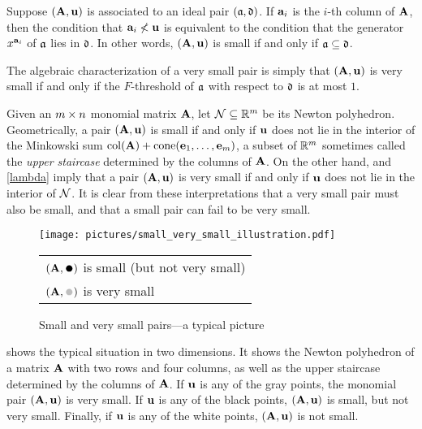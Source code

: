 \documentclass{article}
\begin{document}
\begin{remark}
\label{algebraic small and very small: R}
  Suppose $(\mathbf{A}, \mathbf{u})$ is associated to an ideal pair $(\mathfrak{a}, \mathfrak{d})$.  If $\mathbf{a}_i$ is the $i$-th column of $\mathbf{A}$, then the condition that $\mathbf{a}_i \not < \mathbf{u}$ is equivalent to the condition that the generator $x^{\mathbf{a}_i}$ of $\mathfrak{a}$ lies in $\mathfrak{d}$.  In other words, $(\mathbf{A}, \mathbf{u})$ is small if and only if $\mathfrak{a} \subseteq \mathfrak{d}$.

The algebraic characterization of a very small pair is simply that $(\mathbf{A}, \mathbf{u})$ is very small if and only if the $F$-threshold of $\mathfrak{a}$ with respect to $\mathfrak{d}$ is at most $1$.
\end{remark}

\begin{remark}
\label{geometric small and very small: R}
Given an $m \times n$ monomial matrix $\mathbf{A}$, let $\mathcal{N} \subseteq \mathbb{R}^{m}$ be its Newton polyhedron.
Geometrically, a pair $(\mathbf{A}, \mathbf{u})$ is small if and only if $\mathbf{u}$ does not lie in the interior of the Minkowski sum $\operatorname{col}(\mathbf{A}) + \operatorname{cone}(\mathbf{e}_1,\ldots,\mathbf{e}_m)$, a subset of $\mathbb{R}^{m}$ sometimes called the \emph{upper staircase} determined by the columns of $\mathbf{A}$.
On the other hand,  and \ref{lambda} imply that a pair $(\mathbf{A}, \mathbf{u})$ is very small if and only if $\mathbf{u}$ does not lie in the interior of $\mathcal{N}$.
It is clear from these interpretations that a very small pair must also be small, and that a small pair can fail to be very small.
\end{remark}

\begin{example}
   \label{ex: small vs very small}
   \begin{figure}
      \centering
      \texttt{[image: pictures/small\_very\_small\_illustration.pdf]}\\[2mm]
      \begin{tabular}{l}
        $(\matA,\mathbin{\vcenter{\hbox{\scalebox{1.5}{$\bullet$}}}})$ is small (but not very small)\\[1mm]
        $(\matA,\textcolor{lightgray}{\mathbin{\vcenter{\hbox{\scalebox{1.5}{$\bullet$}}}}})$ is very small
      \end{tabular}                                                              
      \caption{Small and very small pairs---a typical picture}
      \label{fig: small vs very small}
   \end{figure}
    shows the typical situation in two dimensions.
   It shows the Newton polyhedron of a matrix $\mathbf{A}$ with two rows and four columns, as well as the upper staircase determined by the columns of $\mathbf{A}$.
   If $\mathbf{u}$ is any of the gray points, the monomial pair $(\mathbf{A},\mathbf{u})$ is very small.
   If $\mathbf{u}$ is any of the black points, $(\mathbf{A},\mathbf{u})$ is small, but not very small.
   Finally, if $\mathbf{u}$ is any of the white points, $(\mathbf{A},\mathbf{u})$ is not small.
\end{example}
\end{document}
